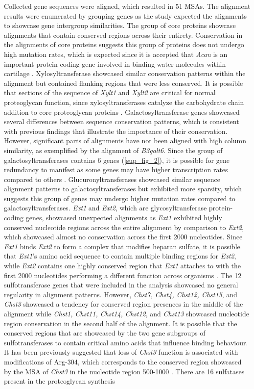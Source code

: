 \documentclass{article}
\begin{document}
Collected gene sequences were aligned, which resulted in 51 MSAs. The alignment results were enumerated by grouping genes as the study expected the alignments to showcase gene intergroup similarities. The group of core proteins showcase alignments that contain conserved regions across their entirety. Conservation in the alignments of core proteins suggests this group of proteins does not undergo high mutation rates, which is expected since it is accepted that \textit{Acan} is an important protein-coding gene involved in binding water molecules within cartilage \cite{proteo_osteo1}. Xylosyltransferase showcased similar conservation patterns within the alignment but contained flanking regions that were less conserved. It is possible that sections of the sequence of \textit{Xylt1} and \textit{Xylt2} are critical for normal proteoglycan function, since xylosyltransferases catalyze the carbohydrate chain addition to core proteoglycan proteins \cite{xylt}. Galactosyltransferase genes showcased several differences between sequence conservation patterns, which is consistent with previous findings that illustrate the importance of their conservation. However, significant parts of alignments have not been aligned with high column similarity, as exemplified by the alignment of \textit{B3galt6}. Since the group of galactosyltransferases contains 6 genes (\ref{sup_fig_2}), it is possible for gene redundancy to manifest as some genes may have higher transcription rates compared to others \cite{galt}. Glucuronyltransferases showcased similar sequence alignment patterns to galactosyltransferases but exhibited more sparsity, which suggests this group of genes may undergo higher mutation rates compared to galactosyltransferases. \textit{Ext1} and \textit{Ext2}, which are glycosyltransferase protein-coding genes, showcased unexpected alignments as \textit{Ext1} exhibited highly conserved nucleotide regions across the entire alignment by comparison to \textit{Ext2}, which showcased almost no conservation across the first 2000 nucleotides. Since \textit{Ext1} binds \textit{Ext2} to form a complex that modifies heparan sulfate, it is possible that \textit{Ext1}'s amino acid sequence to contain multiple binding regions for \textit{Ext2}, while \textit{Ext2} contains one highly conserved region that \textit{Ext1} attaches to with the first 2000 nucleotides performing a different function across organisms \cite{ext}. The 12 sulfotransferase genes that were included in the analysis showcased no general regularity in alignment patterns. However, \textit{Chst7, Chst4, Chst12, Chst15}, and \textit{Chst3} showcased a tendency for conserved region presences in the middle of the alignment while \textit{Chst1, Chst11, Chst14, Chst12}, and \textit{Chst13} showcased nucleotide region conservation in the second half of the alignment. It is possible that the conserved regions that are showcased by the two gene subgroups of sulfotransferases to contain critical amino acids that influence binding behaviour. It has been previously suggested that loss of \textit{Chst3} function is associated with modifications of Arg-304, which corresponds to the conserved region showcased by the MSA of \textit{Chst3} in the nucleotide region 500-1000 \cite{chst}. There are 16 sulfatases present in the proteoglycan synthesis 
\end{document}
